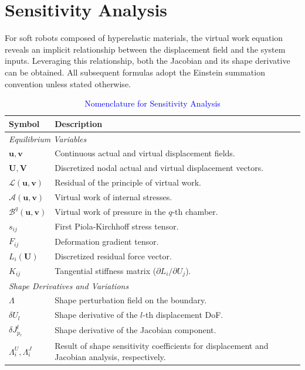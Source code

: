 \documentclass[journal]{IEEEtran}
\theoremstyle{definition}
\begin{document}
\section{Sensitivity Analysis}
\label{sec:sensitivity}

For soft robots composed of hyperelastic materials, the virtual work equation reveals an implicit relationship between the displacement field and the system inputs. Leveraging this relationship, both the Jacobian and its shape derivative can be obtained. All subsequent formulas adopt the Einstein summation convention unless stated otherwise.

\begin{table}[h!]
\caption{\textcolor{blue}{Nomenclature for Sensitivity Analysis}}
\label{tab:nomenclature_sensitivity}
\centering
\renewcommand{\arraystretch}{1.2}
\begin{tabular}{lp{5.5cm}}
\toprule
\textbf{Symbol} & \textbf{Description} \\
\midrule
\multicolumn{2}{l}{\textit{Equilibrium Variables}} \\
$\mathbf{u}, \mathbf{v}$ & Continuous actual and virtual displacement fields. \\
$\mathbf{U}, \mathbf{V}$ & Discretized nodal actual and virtual displacement vectors. \\
$\mathcal{L}(\mathbf{u}, \mathbf{v})$ & Residual of the principle of virtual work. \\
$\mathcal{A}(\mathbf{u}, \mathbf{v})$ & Virtual work of internal stresses. \\
$\mathcal{B}^q(\mathbf{u}, \mathbf{v})$ & Virtual work of pressure in the $q$-th chamber. \\
$s_{ij}$ & First Piola-Kirchhoff stress tensor. \\
$F_{ij}$ & Deformation gradient tensor. \\
$L_i(\mathbf{U})$ & Discretized residual force vector. \\
$K_{ij}$ & Tangential stiffness matrix ($\partial L_i / \partial U_j$). \\
\midrule
\multicolumn{2}{l}{\textit{Shape Derivatives and Variations}} \\
$\Lambda$ & Shape perturbation field on the boundary. \\
$\delta U_l$ & Shape derivative of the $l$-th displacement DoF. \\
$\delta J^l_{p_r}$ & Shape derivative of the Jacobian component. \\
$\Lambda_i^U, \Lambda_i^J$ & Result of shape sensitivity coefficients for displacement and Jacobian analysis, respectively. \\

\end{tabular}
\end{table}
\end{document}
